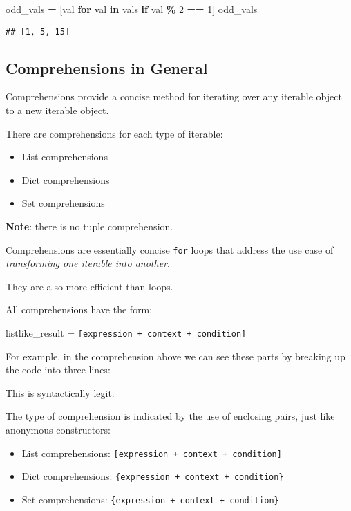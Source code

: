 \documentclass[
]{book}
\newenvironment{Shaded}{\begin{snugshade}}{\end{snugshade}}
\newcommand{\ControlFlowTok}[1]{\textcolor[rgb]{0.13,0.29,0.53}{\textbf{#1}}}
\newcommand{\DecValTok}[1]{\textcolor[rgb]{0.00,0.00,0.81}{#1}}
\newcommand{\KeywordTok}[1]{\textcolor[rgb]{0.13,0.29,0.53}{\textbf{#1}}}
\newcommand{\NormalTok}[1]{#1}
\newcommand{\OperatorTok}[1]{\textcolor[rgb]{0.81,0.36,0.00}{\textbf{#1}}}
\providecommand{\tightlist}{%
  \setlength{\itemsep}{0pt}\setlength{\parskip}{0pt}}
\begin{document}
\begin{Shaded}
\begin{Highlighting}[]
\NormalTok{odd\_vals }\OperatorTok{=}\NormalTok{ [val }\ControlFlowTok{for}\NormalTok{ val }\KeywordTok{in}\NormalTok{ vals }\ControlFlowTok{if}\NormalTok{ val }\OperatorTok{\%} \DecValTok{2} \OperatorTok{==} \DecValTok{1}\NormalTok{]}
\NormalTok{odd\_vals}
\end{Highlighting}
\end{Shaded}

\begin{verbatim}
## [1, 5, 15]
\end{verbatim}

\subsection{Comprehensions in General}\label{comprehensions-in-general}

Comprehensions provide a concise method for iterating over any iterable object to a new iterable object.

There are comprehensions for each type of iterable:

\begin{itemize}
\tightlist
\item
  List comprehensions
\item
  Dict comprehensions
\item
  Set comprehensions
\end{itemize}

\textbf{Note}: there is no tuple comprehension.

Comprehensions are essentially concise \texttt{for} loops that address the use case of \emph{transforming one iterable into another}.

They are also more efficient than loops.

All comprehensions have the form:

listlike\_result = \texttt{{[}expression\ +\ context\ +\ condition{]}}

For example, in the comprehension above we can see these parts by breaking up the code into three lines:

This is syntactically legit.

The type of comprehension is indicated by the use of enclosing pairs, just like anonymous constructors:

\begin{itemize}
\tightlist
\item
  List comprehensions: \texttt{{[}expression\ +\ context\ +\ condition{]}}
\item
  Dict comprehensions: \texttt{\{expression\ +\ context\ +\ condition\}}
\item
  Set comprehensions: \texttt{\{expression\ +\ context\ +\ condition\}}
\end{itemize}
\end{document}

